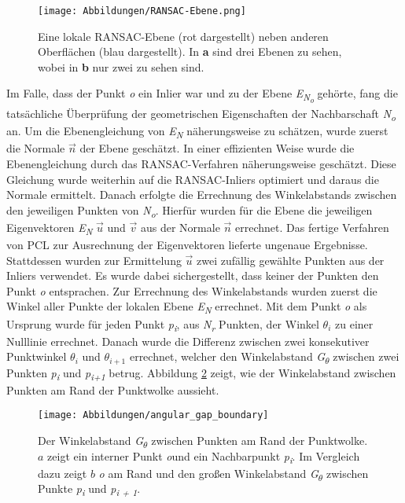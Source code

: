 \begin{figure}[t]
	\texttt{[image: Abbildungen/RANSAC-Ebene.png]}
	\centering
	\caption{Eine lokale RANSAC-Ebene (rot dargestellt) neben anderen Oberflächen (blau dargestellt). In \textbf{a} sind drei Ebenen zu sehen, wobei in \textbf{b} nur zwei zu sehen sind. \autocite{ni_edge_2016}}
	\label{RANSAC-Ebene}
\end{figure} 

Im Falle, dass der Punkt \textit{o} ein Inlier war und zu der Ebene \textit{E\textsubscript{N\textsubscript{o}}} gehörte, fang die tatsächliche Überprüfung der geometrischen Eigenschaften der Nachbarschaft \textit{N\textsubscript{o}} an. Um die Ebenengleichung von \textit{E\textsubscript{N}} näherungsweise zu schätzen, wurde zuerst die Normale \textit{$\vec{n}$} der Ebene geschätzt. In einer effizienten Weise wurde die Ebenengleichung durch das RANSAC-Verfahren näherungsweise geschätzt. Diese Gleichung wurde weiterhin auf die RANSAC-Inliers optimiert und daraus die Normale  ermittelt. Danach erfolgte die Errechnung des Winkelabstands zwischen den jeweiligen Punkten von \textit{N\textsubscript{o}}. Hierfür wurden für die Ebene die jeweiligen Eigenvektoren \textit{E\textsubscript{N}} $\vec{u}$ und $\vec{v}$ aus der Normale $\vec{n}$ errechnet. Das fertige Verfahren von PCL zur Ausrechnung der Eigenvektoren lieferte ungenaue Ergebnisse. Stattdessen wurden zur Ermittelung \textit{$\vec{u}$} zwei zufällig gewählte Punkten aus der Inliers verwendet. Es wurde dabei sichergestellt, dass keiner der Punkten den Punkt \textit{o} entsprachen. Zur Errechnung des Winkelabstands wurden zuerst die Winkel aller Punkte der lokalen Ebene \textit{E\textsubscript{N}} errechnet. Mit dem Punkt \textit{o} als Ursprung wurde für jeden Punkt \textit{p\textsubscript{i}}, aus \textit{N\textsubscript{r}} Punkten, der Winkel \textit{$\theta_i$} zu einer Nulllinie errechnet. Danach wurde die Differenz zwischen zwei konsekutiver Punktwinkel $\theta_i$ und $\theta_{i+1}$ errechnet, welcher den Winkelabstand \textit{G\textsubscript{$\theta$}} zwischen zwei Punkten \textit{p\textsubscript{i}} und \textit{p\textsubscript{i+1}} betrug. Abbildung \ref{edge_boundary} zeigt, wie der Winkelabstand zwischen Punkten am Rand der Punktwolke aussieht.

\begin{figure}[h]
	\texttt{[image: Abbildungen/angular\_gap\_boundary]}
	\centering
	\caption{Der Winkelabstand \textit{G\textsubscript{$\theta$}} zwischen Punkten am Rand der Punktwolke. \textbf{\(a\)} zeigt ein interner Punkt \textit{o}und ein Nachbarpunkt \textit{p\textsubscript{i}}. Im Vergleich dazu zeigt \textbf{\(b\)} \textit{o} am Rand und den großen Winkelabstand \textit{G\textsubscript{$\theta$}} zwischen Punkte \textit{p\textsubscript{i}} und \textit{p\textsubscript{i + 1}}. \autocite{ni_edge_2016}}
	\label{edge_boundary}
\end{figure}

